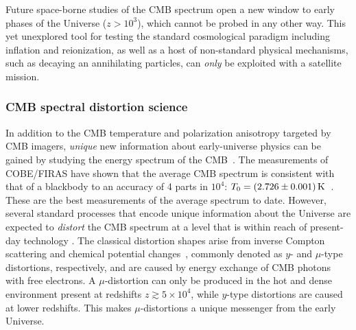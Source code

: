 Future space-borne studies of the CMB spectrum open a new window to early phases of the Universe ($z > 10^3$), 
which cannot be probed in any other way. This yet unexplored tool for testing the standard cosmological paradigm 
including inflation and reionization, 
as well as a host of non-standard physical mechanisms, such as decaying an annihilating particles, 
can {\it only} be exploited with a satellite mission. 


\vspace{-0.15in}
\subsubsection{CMB spectral distortion science}
\vspace{-0.05in}

In addition to the CMB temperature and polarization anisotropy targeted by CMB imagers, {\it unique} new information about 
early-universe physics can be gained by studying the energy spectrum of the 
CMB~\citep{Sunyaev1970SPEC, Burigana1993, Hu1993, Chluba2011therm}. The measurements of COBE/FIRAS have shown that 
the average CMB spectrum is consistent with that of a blackbody to an accuracy of 4 parts in $10^{4}$: 
$T_0=(2.726\pm 0.001)\,{\rm K}$~\citep{Mather1994, Fixsen1996}. These are the best measurements
of the average spectrum to date. However, several standard processes that encode 
unique information about the Universe are expected to {\it distort} 
the CMB spectrum \citep[e.g.,][]{Chluba2016LCDM} at a level that is within reach of present-day technology \citep{Kogut2011PIXIE, PRISM2013WPII}. 
%
The classical distortion shapes arise from inverse Compton scattering and chemical potential changes~\citep{Zeldovich1969, Sunyaev1970mu}, 
commonly denoted as $y$- and $\mu$-type distortions, respectively, and are caused by energy exchange of CMB photons with free electrons. 
A $\mu$-distortion can only be produced in the hot and dense environment present at redshifts $z\gtrsim 5\times10^4$, while $y$-type 
distortions are caused at lower redshifts. This makes $\mu$-distortions a unique messenger from the early Universe. 

